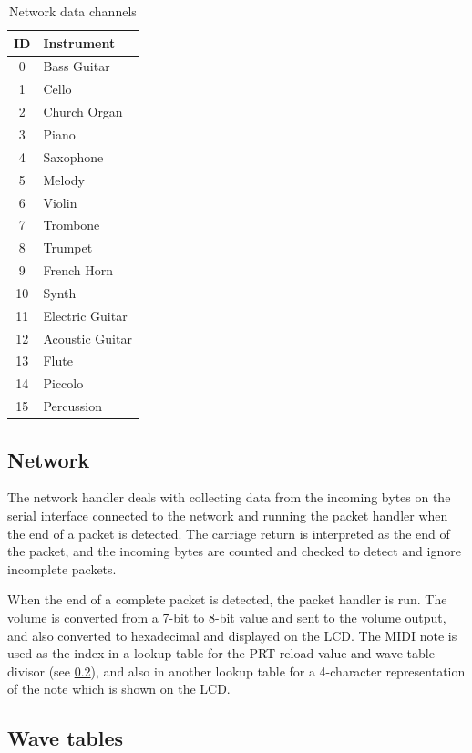 \documentclass[a4paper,10pt]{article}
\begin{document}
\begin{table}[htbp]
\centering
\begin{tabular}[bp]{c l}
ID & Instrument \\
\hline
0 & Bass Guitar \\
1 & Cello \\
2 & Church Organ \\
3 & Piano \\
4 & Saxophone \\
5 & Melody \\
6 & Violin \\
7 & Trombone \\
8 & Trumpet \\
9 & French Horn \\
10 & Synth \\
11 & Electric Guitar \\
12 & Acoustic Guitar \\
13 & Flute \\
14 & Piccolo \\
15 & Percussion
\end{tabular}
\caption{Network data channels}\label{tab:channelids}
\end{table}

\subsection{Network}

The network handler deals with collecting data from the incoming bytes on the serial interface 
connected to the network and running the packet handler when the end of a packet is detected.  The 
carriage return is interpreted as the end of the packet, and the incoming bytes are counted and 
checked to detect and ignore incomplete packets.

When the end of a complete packet is detected, the packet handler is run.  The volume is converted 
from a 7-bit to 8-bit value and sent to the volume output, and also converted to hexadecimal and 
displayed on the LCD.  The MIDI note is used as the index in a lookup table for the PRT reload value 
and wave table divisor (see \ref{wavetables}), and also in another lookup table for a 4-character 
representation of the note which is shown on the LCD.

\subsection{Wave tables}
\label{wavetables}
\end{document}
